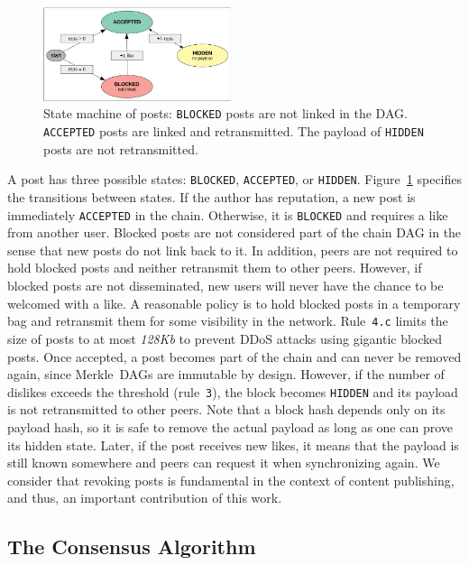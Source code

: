 \documentclass[10pt,journal,compsoc]{IEEEtran}
\newcommand{\code}[1]  {\texttt{\footnotesize{#1}}}
\begin{document}
\begin{figure}
\centering
\includegraphics[width=0.49\textwidth]{state.png}
\caption{
    State machine of posts:
    \code{BLOCKED} posts are not linked in the DAG.
    \code{ACCEPTED} posts are linked and retransmitted.
    The payload of \code{HIDDEN} posts are not retransmitted.
}
\label{fig.state}
\end{figure}

A post has three possible states: \code{BLOCKED}, \code{ACCEPTED}, or
\code{HIDDEN}.
Figure~\ref{fig.state} specifies the transitions between states.
%
If the author has reputation, a new post is immediately \code{ACCEPTED} in the
chain.
%
Otherwise, it is \code{BLOCKED} and requires a like from another user.
Blocked posts are not considered part of the chain DAG in the sense that new
posts do not link back to it.
In addition, peers are not required to hold blocked posts and neither
retransmit them to other peers.
However, if blocked posts are not disseminated, new users will never have the
chance to be welcomed with a like.
A reasonable policy is to hold blocked posts in a temporary bag and retransmit
them for some visibility in the network.
Rule~\code{4.c} limits the size of posts to at most \emph{128Kb} to prevent
DDoS attacks using gigantic blocked posts.
%
Once accepted, a post becomes part of the chain and can never be removed
again, since Merkle~DAGs are immutable by design.
%
However, if the number of dislikes exceeds the threshold (rule~\code{3}), the
block becomes \code{HIDDEN} and its payload is not retransmitted to other
peers.
Note that a block hash depends only on its payload hash, so it is safe to
remove the actual payload as long as one can prove its hidden state.
Later, if the post receives new likes, it means that the payload is still known
somewhere and peers can request it when synchronizing again.
We consider that revoking posts is fundamental in the context of content
publishing, and thus, an important contribution of this work.

\subsection{The Consensus Algorithm}
\label{sec.consensus.algo}
\end{document}
